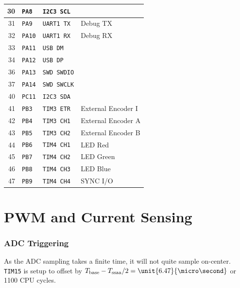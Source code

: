 \documentclass[12pt,a4paper,oneside,openany]{article}
\begin{document}
\begin{longtable}[htbp]{@{}rlll@{}}
\midrule 30 & \texttt{PA8}  &\texttt{I2C3 SCL}  & \\
\midrule 31 & \texttt{PA9}  &\texttt{UART1 TX}  & Debug TX \\
         32 & \texttt{PA10} &\texttt{UART1 RX}  & Debug RX \\
\midrule 33 & \texttt{PA11} &\texttt{USB DM}    & \\
         34 & \texttt{PA12} &\texttt{USB DP}    & \\
\midrule 36 & \texttt{PA13} &\texttt{SWD SWDIO} & \\
         37 & \texttt{PA14} &\texttt{SWD SWCLK} & \\
\midrule 40 & \texttt{PC11} &\texttt{I2C3 SDA}  & \\
\midrule 41 & \texttt{PB3}  &\texttt{TIM3 ETR}  & External Encoder I\\
         42 & \texttt{PB4}  &\texttt{TIM3 CH1}  & External Encoder A\\
         43 & \texttt{PB5}  &\texttt{TIM3 CH2}  & External Encoder B\\
\midrule 44 & \texttt{PB6}  &\texttt{TIM4 CH1}  & LED Red \\
         45 & \texttt{PB7}  &\texttt{TIM4 CH2}  & LED Green \\
         46 & \texttt{PB8}  &\texttt{TIM4 CH3}  & LED Blue \\
         47 & \texttt{PB9}  &\texttt{TIM4 CH4}  & SYNC I/O \\
\end{longtable}

\section{PWM and Current Sensing}


\subsubsection{ADC Triggering}

As the ADC sampling takes a finite time, it will not quite sample on-center. \texttt{TIM15} is setup to offset by $T_{\textrm{base}} - T_{\textrm{ssaa}}/2 = \unit{6.47}{\micro\second}$ or 1100 CPU cycles.
\end{document}
